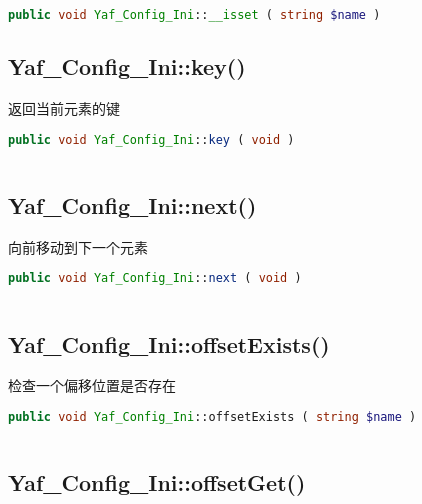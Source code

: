 \begin{lstlisting}[language=PHP]
public void Yaf_Config_Ini::__isset ( string $name )
\end{lstlisting}


\subsection{Yaf\_Config\_Ini::key()}

返回当前元素的键


\begin{lstlisting}[language=PHP]
public void Yaf_Config_Ini::key ( void )
\end{lstlisting}



\begin{lstlisting}[language=PHP]

\end{lstlisting}


\subsection{Yaf\_Config\_Ini::next()}

向前移动到下一个元素

\begin{lstlisting}[language=PHP]
public void Yaf_Config_Ini::next ( void )
\end{lstlisting}

\begin{lstlisting}[language=PHP]

\end{lstlisting}



\subsection{Yaf\_Config\_Ini::offsetExists()}

检查一个偏移位置是否存在

\begin{lstlisting}[language=PHP]
public void Yaf_Config_Ini::offsetExists ( string $name )
\end{lstlisting}

\begin{lstlisting}[language=PHP]

\end{lstlisting}



\subsection{Yaf\_Config\_Ini::offsetGet()}


